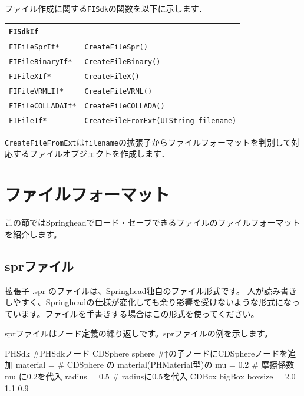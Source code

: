 \KLUDGE ファイル作成に関する\texttt{FISdk}の関数を以下に示します．

\begin{center}
\begin{tabular}{p{.3\hsize}p{.6\hsize}}
\texttt{FISdkIf}															\\ \midrule
\texttt{FIFileSprIf*}		& \texttt{CreateFileSpr()}						\\
\texttt{FIFileBinaryIf*} 	& \texttt{CreateFileBinary()}					\\
\texttt{FIFileXIf*}			& \texttt{CreateFileX()}						\\
\texttt{FIFileVRMLIf*}		& \texttt{CreateFileVRML()}						\\
\texttt{FIFileCOLLADAIf*}	& \texttt{CreateFileCOLLADA()}					\\
\texttt{FIFileIf*}			& \texttt{CreateFileFromExt(UTString filename)}	\\
\end{tabular}
\end{center}

\texttt{CreateFileFromExt}は\texttt{filename}の拡張子からファイルフォーマットを判別して対応するファイルオブジェクトを作成します．

\section{ファイルフォーマット}
\KLUDGE この節ではSpringheadでロード・セーブできるファイルのファイルフォーマットを紹介します。

\subsection{sprファイル}
\KLUDGE 拡張子 .spr のファイルは、Springhead独自のファイル形式です。
\KLUDGE 人が読み書きしやすく、Springheadの仕様が変化しても余り影響を受けないような形式になっています。ファイルを手書きする場合はこの形式を使ってください。

sprファイルはノード定義の繰り返しです。sprファイルの例を示します。

\begin{sourcecode}
PHSdk{                  #PHSdkノード
    CDSphere sphere{    #↑の子ノードにCDSphereノードを追加
        material = {    # CDSphere の material(PHMaterial型)の
            mu = 0.2    # 摩擦係数 mu に0.2を代入
        }
        radius = 0.5    # radiusに0.5を代入
    }
    CDBox bigBox{
        boxsize = 2.0 1.1 0.9
    }
}
\end{sourcecode}

